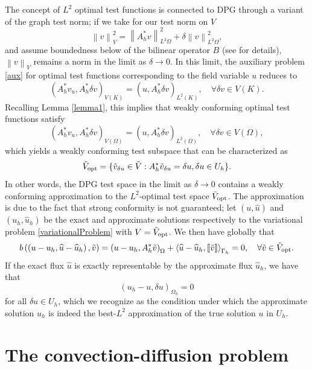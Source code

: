 \documentclass[11pt,onecolumn]{scrartcl}
\newcommand{\nor}[1]{\left\| #1 \right\|}
\newcommand{\LRp}[1]{\left( #1 \right)}
\newcommand{\LRs}[1]{\left[ #1 \right]}
\newcommand{\LRa}[1]{\left\langle #1 \right\rangle}
\newcommand{\jump}[1] {\ensuremath{\LRs{\!\left[#1\right]\!}}}
\newcommand{\uh}{\widehat{u}}
\newcommand{\Gh}{\Gamma_h}
\newcommand{\Oh}{\Omega_h}
\begin{document}
The concept of $L^2$ optimal test functions is connected to DPG through a variant of the graph test norm; if we take for our test norm on $V$
\[
\nor{v}_V^2 = \nor{A_h^*v}_{L^2{\Omega}}^2 + \delta \nor{v}_{L^2{\Omega}}^2,
\]
and assume boundedness below of the bilinear operator $B$ (see \cite{DPG4} for details), $\nor{v}_V$ remains a norm in the limit as $\delta \rightarrow 0$.  In this limit, the auxiliary problem \eqref{aux} for optimal test functions corresponding to the field variable $u$ reduces to
\[
\LRp{A^*_h v_u, A^*_h \delta v}_{V(K)} = \LRp{u,A^*_h \delta v}_{L^2(K)}, \quad \forall \delta v \in V(K).
\]
Recalling Lemma \ref{lemma1}, this implies that weakly conforming optimal test functions satisfy
\[
\LRp{A^*_h v_u, A^*_h \delta v}_{V(\Omega)} = \LRp{u,A^*_h \delta v}_{L^2(\Omega)}, \quad \forall \delta v \in V(\Omega),
\]
which yields a weakly conforming test subspace that can be characterized as
\[
\tilde{V}_{\rm opt} = \{\tilde{v}_{\delta u} \in \tilde{V}: A^*_h \tilde{v}_{\delta u} = {\delta u}, {\delta u} \in U_h\}.
\]
In other words, the DPG test space in the limit as $\delta \rightarrow 0$ contains a weakly conforming approximation to the $L^2$-optimal test space $\bar{V}_{\rm opt}$.  The approximation is due to the fact that strong conformity is not guaranteed; let $\LRp{u,\uh}$ and $\LRp{u_h,\uh_h}$ be the exact and approximate solutions respectively to the variational problem \eqref{variationalProblem} with $V = \tilde{V}_{\rm opt}$.  We then have globally that
\[
b\LRp{\LRp{u-u_h,\uh-\uh_h},\tilde{v}} = \LRp{u-u_h,A^*_h \tilde{v}}_{\Omega} + \LRa{\uh-\uh_h,\jump{\tilde{v}}}_{\Gh} = 0, \quad \forall \tilde{v}\in \tilde{V}_{\rm opt}.
\]
If the exact flux $\uh$ is exactly representable by the approximate flux $\uh_h$, we have that 
\[
\LRp{u_h-u,\delta u}_{\Oh} = 0
\]
for all $\delta u \in U_h$, which we recognize as the condition under which the approximate solution $u_h$ is indeed the best-$L^2$ approximation of the true solution $u$ in $U_h$.  


\section{The convection-diffusion problem}
\end{document}
